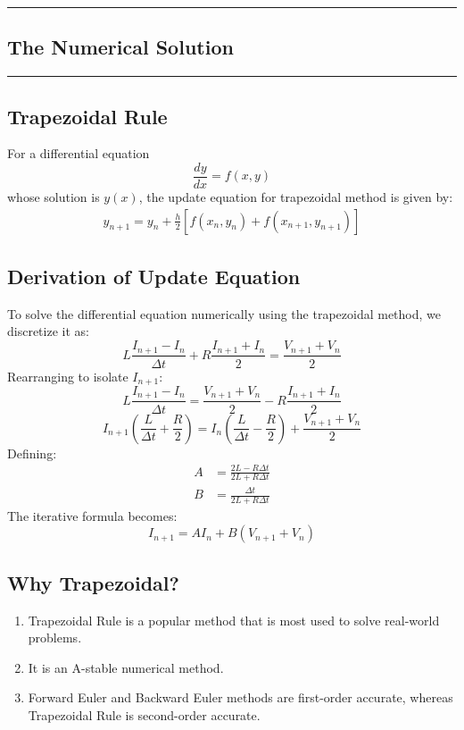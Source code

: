 \newpage
{\color{gray}\hrule}
\begin{center}
\section{The Numerical Solution}
\bigskip
\end{center}
{\color{gray}\hrule}
\begin{multicols}{2}

\subsection{Trapezoidal Rule}
For a differential equation $$\frac{dy}{dx} = f(x,y)$$ whose solution is $y(x)$, the update equation for trapezoidal method is given by:
\begin{align}
    y_{n+1} = y_n + \frac{h}{2}\left[ f(x_n,y_n) + f(x_{n+1},y_{n+1}) \right]
\end{align}
\subsection{Derivation of Update Equation}
To solve the differential equation numerically using the trapezoidal method, we discretize it as:
\begin{equation}
L \frac{I_{n+1} - I_n}{\Delta t} + R \frac{I_{n+1} + I_n}{2} = \frac{V_{n+1} + V_n}{2}
\end{equation}
Rearranging to isolate $I_{n+1}$:
\begin{equation}
L \frac{I_{n+1} - I_n}{\Delta t} = \frac{V_{n+1} + V_n}{2} - R \frac{I_{n+1} + I_n}{2}
\end{equation}
\begin{equation}
I_{n+1} \left( \frac{L}{\Delta t} + \frac{R}{2} \right) = I_n \left( \frac{L}{\Delta t} - \frac{R}{2} \right) + \frac{V_{n+1} + V_n}{2}
\end{equation}
Defining:
\begin{align}
A &= \frac{2L - R \Delta t}{2L + R \Delta t} \\
B &= \frac{\Delta t}{2L + R \Delta t}
\end{align}
The iterative formula becomes:
\begin{equation}
I_{n+1} = A I_n + B (V_{n+1} + V_n)
\end{equation}
\subsection{Why Trapezoidal?}
\begin{enumerate}
    \item Trapezoidal Rule is a popular method that is most used to solve real-world problems.
    \item It is an A-stable numerical method.
    \item Forward Euler and Backward Euler methods are first-order accurate, whereas Trapezoidal Rule is second-order accurate.
\end{enumerate}


\end{multicols}
